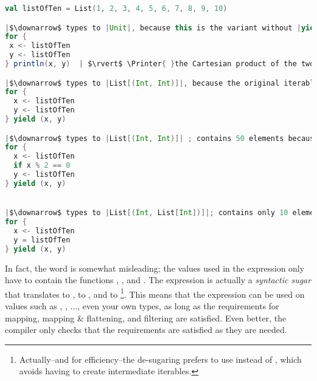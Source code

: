 \documentclass[10 pt]{article}
\begin{document}

\begin{lstlisting}[caption={Various for expessions}, label={code:for}, language=Scala, escapechar=|]
val listOfTen = List(1, 2, 3, 4, 5, 6, 7, 8, 9, 10)

|$\downarrow$ types to |Unit|, because this is the variant without |yield body|.|
for {
 x <- listOfTen
 y <- listOfTen
} println(x, y)  | $\rvert$ \Printer{ }the Cartesian product of the two lists: |(1, 1), (1, 2), ..., (1, 10), ..., (10, 9), (10, 10)

|$\downarrow$ types to |List[(Int, Int)]|, because the original iterable was |List|, and the |yield body| evaluates to type |(Int, Int)|; contains 100 elements.|
for {
  x <- listOfTen
  y <- listOfTen
} yield (x, y)

|$\downarrow$ types to |List[(Int, Int)]| ; contains 50 elements because of the |if| filter.|
for {
  x <- listOfTen
  if x % 2 == 0
  y <- listOfTen
} yield (x, y)


|$\downarrow$ types to |List[(Int, List[Int])]|; contains only 10 elements.|
for {
  x <- listOfTen
  y = listOfTen
} yield (x, y)
\end{lstlisting}

In fact, the word  is somewhat misleading; the values used in the  expression only have to contain the functions , , and . The  expression is actually a \emph{syntactic sugar} that translates \pcode{<-} to , \pcode{=} to , and  to \footnote{Actually--and for efficiency--the de-sugaring prefers to use  instead of , which avoids having to create intermediate iterables.}. This means that the  expression can be used on values such as , , ..., even your own types, as long as the requirements for mapping, mapping \& flattening, and filtering are satisfied. Even better, the compiler only checks that the requirements are satisfied as they are needed. 
\end{document}
